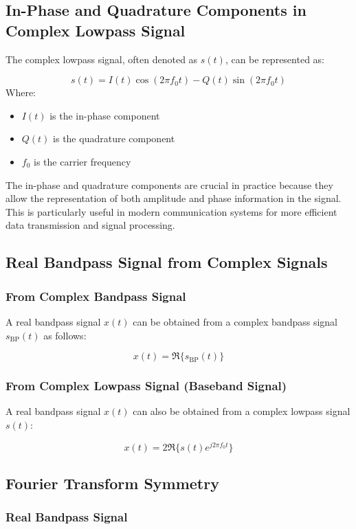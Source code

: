 \documentclass{article}
\begin{document}
\subsection*{In-Phase and Quadrature Components in Complex Lowpass Signal}

The complex lowpass signal, often denoted as $s(t)$, can be represented as:

\[
s(t) = I(t) \cos(2\pi f_0 t) - Q(t) \sin(2\pi f_0 t)
\]
Where:
\begin{itemize}
  \item $I(t)$ is the in-phase component
  \item $Q(t)$ is the quadrature component
  \item $f_0$ is the carrier frequency
\end{itemize}
The in-phase and quadrature components are crucial in practice because they allow the representation of both amplitude and phase information in the signal. This is particularly useful in modern communication systems for more efficient data transmission and signal processing.

\subsection*{Real Bandpass Signal from Complex Signals}

\subsubsection*{From Complex Bandpass Signal}

A real bandpass signal $x(t)$ can be obtained from a complex bandpass signal $s_{\text{BP}}(t)$ as follows:

\[
x(t) = \Re\{ s_{\text{BP}}(t) \}
\]

\subsubsection*{From Complex Lowpass Signal (Baseband Signal)}

A real bandpass signal $x(t)$ can also be obtained from a complex lowpass signal $s(t)$:

\[
x(t) = 2\Re\{ s(t) e^{j2\pi f_0 t} \}
\]

\subsection*{Fourier Transform Symmetry}

\subsubsection*{Real Bandpass Signal}
\end{document}
